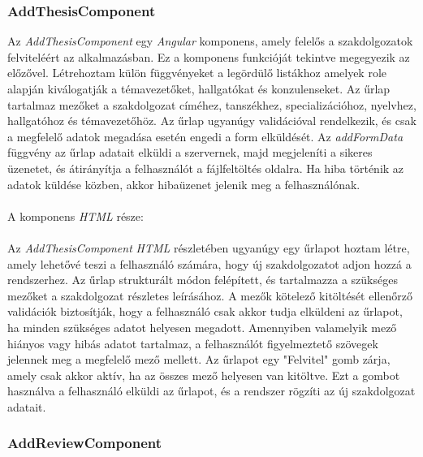 \subsubsection{AddThesisComponent}

Az \textit{AddThesisComponent} egy \textit{Angular} komponens, amely felelős a szakdolgozatok felviteléért az alkalmazásban. Ez a komponens funkcióját tekintve megegyezik az előzővel. Létrehoztam külön függvényeket a legördülő listákhoz amelyek role alapján kiválogatják a témavezetőket, hallgatókat és konzulenseket.  Az űrlap tartalmaz mezőket a szakdolgozat címéhez, tanszékhez, specializációhoz, nyelvhez, hallgatóhoz és témavezetőhöz. Az űrlap ugyanúgy validációval rendelkezik, és csak a megfelelő adatok megadása esetén engedi a form elküldését. Az \textit{addFormData} függvény az űrlap adatait elküldi a szervernek, majd megjeleníti a sikeres üzenetet, és átirányítja a felhasználót a fájlfeltöltés oldalra. Ha hiba történik az adatok küldése közben, akkor hibaüzenet jelenik meg a felhasználónak.\\
\\
A komponens \textit{HTML} része:\\
\\
Az \textit{AddThesisComponent} \textit{HTML} részletében ugyanúgy egy űrlapot hoztam létre, amely lehetővé teszi a felhasználó számára, hogy új szakdolgozatot adjon hozzá a rendszerhez. Az űrlap strukturált módon felépített, és tartalmazza a szükséges mezőket a szakdolgozat részletes leírásához. A mezők kötelező kitöltését ellenőrző validációk biztosítják, hogy a felhasználó csak akkor tudja elküldeni az űrlapot, ha minden szükséges adatot helyesen megadott. Amennyiben valamelyik mező hiányos vagy hibás adatot tartalmaz, a felhasználót figyelmeztető szövegek jelennek meg a megfelelő mező mellett. Az űrlapot egy "Felvitel" gomb zárja, amely csak akkor aktív, ha az összes mező helyesen van kitöltve. Ezt a gombot használva a felhasználó elküldi az űrlapot, és a rendszer rögzíti az új szakdolgozat adatait.

\subsubsection{AddReviewComponent}

